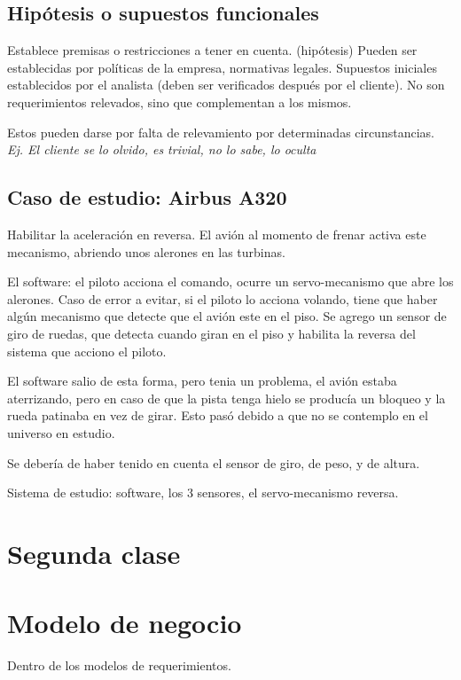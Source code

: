 \documentclass[titlepage,a4paper]{article}
\begin{document}
\subsection{Hipótesis o supuestos funcionales}
Establece premisas o restricciones a tener en cuenta. (hipótesis)
Pueden ser establecidas por políticas de la empresa, normativas legales. Supuestos iniciales establecidos por el analista (deben ser verificados después por el cliente). No son requerimientos relevados, sino que complementan a los mismos.

Estos pueden darse por falta de relevamiento por determinadas circunstancias. \textit{Ej. El cliente se lo olvido, es trivial, no lo sabe, lo oculta}

\subsection{Caso de estudio: Airbus A320}

Habilitar la aceleración en reversa. El avión al momento de frenar activa este mecanismo, abriendo unos alerones en las turbinas.

El software: el piloto acciona el comando, ocurre un servo-mecanismo que abre los alerones. Caso de error a evitar, si el piloto lo acciona volando, tiene que haber algún mecanismo que detecte que el avión este en el piso. Se agrego un sensor de giro de ruedas, que detecta cuando giran en el piso y habilita la reversa del sistema que acciono el piloto.

El software salio de esta forma, pero tenia un problema, el avión estaba aterrizando, pero en caso de que la pista tenga hielo se producía un bloqueo y la rueda patinaba en vez de girar. Esto pasó debido a que no se contemplo en el universo en estudio.

Se debería de haber tenido en cuenta el sensor de giro, de peso, y de altura.

Sistema de estudio: software, los 3 sensores, el servo-mecanismo reversa.

\newpage
\section*{Segunda clase}
\section{Modelo de negocio}
Dentro de los modelos de requerimientos.
\end{document}
